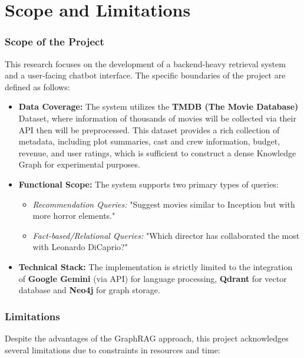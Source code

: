 \documentclass[a4paper, 12pt]{extreport}
\begin{document}
\section{Scope and Limitations}

\subsubsection{Scope of the Project}
This research focuses on the development of a backend-heavy retrieval system and a user-facing chatbot interface. The specific boundaries of the project are defined as follows:

\begin{itemize}
    \item[] \textbf{Data Coverage:} The system utilizes the \textbf{TMDB (The Movie Database)} Dataset, where information of thousands of movies will be collected via their API then will be preprocessed. This dataset provides a rich collection of metadata, including plot summaries, cast and crew information, budget, revenue, and user ratings, which is sufficient to construct a dense Knowledge Graph for experimental purposes.
    
    \item[] \textbf{Functional Scope:} The system supports two primary types of queries:
    \begin{itemize}
        \item[] \textit{Recommendation Queries:} "Suggest movies similar to Inception but with more horror elements."
        \item[] \textit{Fact-based/Relational Queries:} "Which director has collaborated the most with Leonardo DiCaprio?"
    \end{itemize}
    
    \item[] \textbf{Technical Stack:} The implementation is strictly limited to the integration of \textbf{Google Gemini} (via API) for language processing, \textbf{Qdrant} for vector database and \textbf{Neo4j} for graph storage.
\end{itemize}

\subsubsection{Limitations}
Despite the advantages of the GraphRAG approach, this project acknowledges several limitations due to constraints in resources and time:
\end{document}
